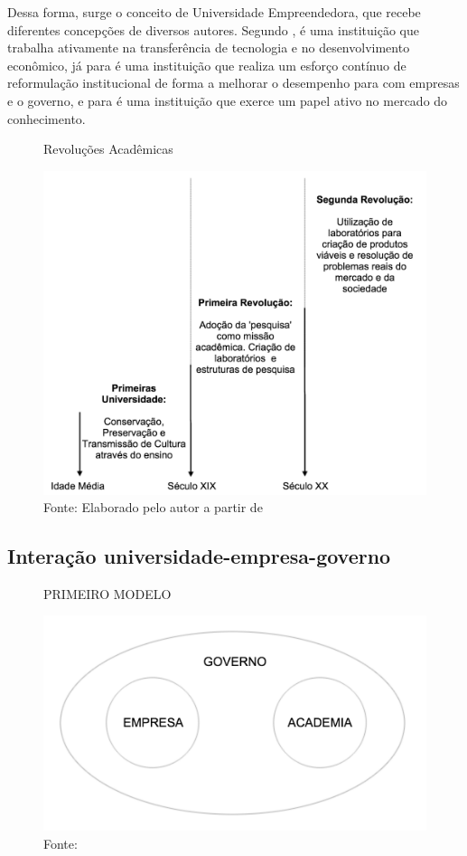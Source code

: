Dessa forma, surge o conceito de Universidade Empreendedora, que recebe diferentes concepções de diversos autores. Segundo , é uma instituição que trabalha ativamente na transferência de tecnologia e no desenvolvimento econômico, já para  é uma instituição que realiza um esforço contínuo de reformulação institucional de forma a melhorar o desempenho para com empresas e o governo, e para  é uma instituição que exerce um papel ativo no mercado do conhecimento.

\begin{figure}
\caption{Revoluções Acadêmicas}
\centerline{\includegraphics[scale=0.5]{img/academic_revolutions}}
\label{fig:academic_revolutions}
\caption* {Fonte: Elaborado pelo autor a partir de }
\end{figure}



\subsection{Interação universidade-empresa-governo}
\label{cha:univ_empreend}

\begin{figure}[H]
\caption{PRIMEIRO MODELO}
\centerline{\includegraphics[scale=0.5]{img/triplehelix1}}
\label{fig:triplehelix1}
\caption* {Fonte: }
\end{figure}

